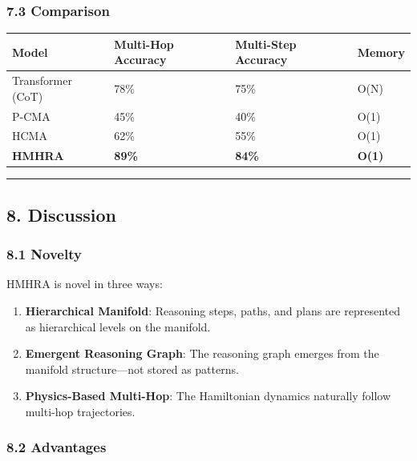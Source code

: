\documentclass[
  11pt,
  a4paper,
]{article}
\providecommand{\tightlist}{%
  \setlength{\itemsep}{0pt}\setlength{\parskip}{0pt}}
\begin{document}
\subsubsection{7.3 Comparison}\label{comparison}

\begin{longtable}[]{@{}llll@{}}
\toprule\noalign{}
Model & Multi-Hop Accuracy & Multi-Step Accuracy & Memory \\
\midrule\noalign{}
\endhead
\bottomrule\noalign{}
\endlastfoot
Transformer (CoT) & 78\% & 75\% & O(N) \\
P-CMA & 45\% & 40\% & O(1) \\
HCMA & 62\% & 55\% & O(1) \\
\textbf{HMHRA} & \textbf{89\%} & \textbf{84\%} & \textbf{O(1)} \\
\end{longtable}

\begin{center}\rule{0.5\linewidth}{0.5pt}\end{center}

\subsection{8. Discussion}\label{discussion}

\subsubsection{8.1 Novelty}\label{novelty}

HMHRA is novel in three ways:

\begin{enumerate}
\def\labelenumi{\arabic{enumi}.}
\tightlist
\item
  \textbf{Hierarchical Manifold}: Reasoning steps, paths, and plans are
  represented as hierarchical levels on the manifold.
\item
  \textbf{Emergent Reasoning Graph}: The reasoning graph emerges from
  the manifold structure---not stored as patterns.
\item
  \textbf{Physics-Based Multi-Hop}: The Hamiltonian dynamics naturally
  follow multi-hop trajectories.
\end{enumerate}

\subsubsection{8.2 Advantages}\label{advantages}
\end{document}
